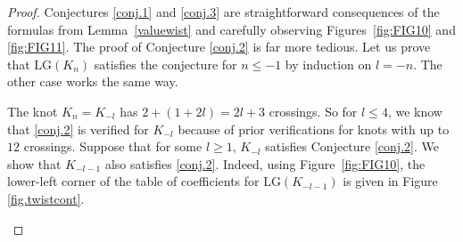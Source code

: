 \documentclass[12pt,reqno]{amsart}
\theoremstyle{definition}
\def\LG{\mathrm{LG}}
\begin{document}
\begin{proof}
    Conjectures \ref{conj.1} and \ref{conj.3} are straightforward consequences of the formulas from Lemma~\ref{valuewist} and carefully observing Figures~\ref{fig:FIG10} and \ref{fig:FIG11}. The proof of Conjecture \ref{conj.2} is far more tedious. Let us prove that $\LG(K_n)$ satisfies the conjecture for $n \leq -1$ by induction on $l = -n$. The other case works the same way. 

    The knot $K_n = K_{-l}$ has $2 + (1+2l) = 2l + 3$ crossings. So for $l \leq 4$, we know that \ref{conj.2} is verified for $K_{-l}$ because of prior verifications for knots with up to $12$ crossings. Suppose that for some $l \geq 1$, $K_{-l}$ satisfies Conjecture \ref{conj.2}. We show that $K_{-l-1}$ also satisfies \ref{conj.2}. Indeed, using Figure~\ref{fig:FIG10}, the lower-left corner of the table of coefficients for $\LG(K_{-l-1})$ is given in Figure \ref{fig.twistcont}.

\begin{figure}[h!]
\end{figure}
\end{proof}
\end{document}
